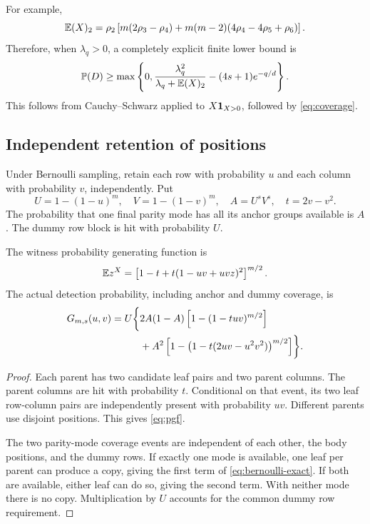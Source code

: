 For example,
\begin{equation}
 \mathbb E(X)_{2}=\rho_2\left[
 m(2\rho_3-\rho_4)+m(m-2)(4\rho_4-4\rho_5+\rho_6)\right].
 \label{eq:second-moment}
\end{equation}
Therefore, when \(\lambda_q>0\), a completely explicit finite lower
bound is
\begin{equation}
 \mathbb P(D)\ge
 \max\left\{0,
 \frac{\lambda_q^2}{\lambda_q+\mathbb E(X)_{2}}
       -(4s+1)e^{-q/d}\right\}.
 \label{eq:sample-lower}
\end{equation}
This follows from Cauchy--Schwarz applied to
\(X\mathbf 1_{X>0}\), followed by \eqref{eq:coverage}.

\subsection{Independent retention of positions}

Under Bernoulli sampling, retain each row with probability \(u\) and
each column with probability \(v\), independently. Put
\[
 U=1-(1-u)^m,\quad V=1-(1-v)^m,\quad
 A=U^sV^s,\quad t=2v-v^2.
\]
The probability that one final parity mode has all its anchor groups
available is \(A\). The dummy row block is hit with probability \(U\).

\begin{proposition}
\label{prop:bernoulli}
The witness probability generating function is
\begin{equation}
 \mathbb E z^X=\left[1-t+t(1-uv+uvz)^2\right]^{m/2}.
 \label{eq:pgf}
\end{equation}
The actual detection probability, including anchor and dummy coverage, is
\begin{align}
 G_{m,s}(u,v)=U\biggl\{&2A(1-A)
    \left[1-(1-tuv)^{m/2}\right]\notag\\
 &+A^2\left[1-\left(1-t(2uv-u^2v^2)\right)^{m/2}\right]\biggr\}.
 \label{eq:bernoulli-exact}
\end{align}
\end{proposition}
\begin{proof}
Each parent has two candidate leaf pairs and two parent columns. The
parent columns are hit with probability \(t\). Conditional on that
event, its two leaf row-column pairs are independently present with
probability \(uv\). Different parents use disjoint positions. This gives
\eqref{eq:pgf}.

The two parity-mode coverage events are independent of each other, the
body positions, and the dummy rows. If exactly one mode is available,
one leaf per parent can produce a copy, giving the first term of
\eqref{eq:bernoulli-exact}. If both are available, either leaf can do
so, giving the second term. With neither mode there is no copy.
Multiplication by \(U\) accounts for the common dummy row requirement.
\end{proof}

